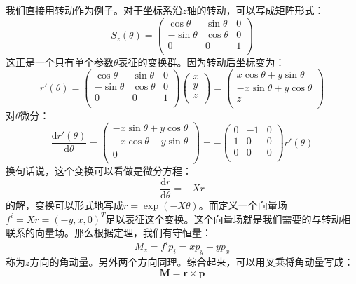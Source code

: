 \documentclass{ctexart}
\begin{document}
我们直接用转动作为例子。对于坐标系沿$z$轴的转动，可以写成矩阵形式：
\begin{equation}
S_z(\theta)=\left(\begin{array}{ccc}\cos\theta & \sin\theta & 0 \\-\sin\theta & \cos\theta & 0 \\0 & 0 & 1 \\\end{array}\right)
\end{equation}
这正是一个只有单个参数$\theta$表征的变换群。因为转动后坐标变为：
\begin{equation}
r'(\theta)=\left(\begin{array}{ccc}\cos\theta & \sin\theta & 0 \\-\sin\theta & \cos\theta & 0 \\0 & 0 & 1 \\\end{array}\right)\left(\begin{array}{c}x \\y \\z \\\end{array}\right)=\left(\begin{array}{c}x\cos\theta+y\sin\theta \\-x\sin\theta+y\cos\theta \\z \\\end{array}\right)
\end{equation}
对$\theta$微分：
\begin{equation}
\frac{\mathrm{d}r'(\theta)}{\mathrm{d}\theta}=\left(\begin{array}{c}-x\sin\theta+y\cos\theta \\-x\cos\theta-y\sin\theta \\0 \\\end{array}\right)=-\left(\begin{array}{ccc}0 & -1 & 0 \\1 & 0 & 0 \\0 & 0 & 0 \\\end{array}\right)r'(\theta)
\end{equation}
换句话说，这个变换可以看做是微分方程：
\begin{equation}
\frac{\mathrm{d}r}{\mathrm{d}\theta}=-Xr
\end{equation}
的解，变换可以形式地写成$r=\exp(-X\theta)$。而定义一个向量场$f^i=Xr=(-y,x,0)^T$足以表征这个变换。这个向量场就是我们需要的与转动相联系的向量场。那么根据定理，我们有守恒量：
\begin{equation}
M_z=f^ip_i=xp_y-yp_x
\end{equation}
称为$z$方向的角动量。另外两个方向同理。综合起来，可以用叉乘将角动量写成：
\begin{equation}
\bm{M}=\bm{r}\times\bm{p}
\end{equation}
\end{document}
